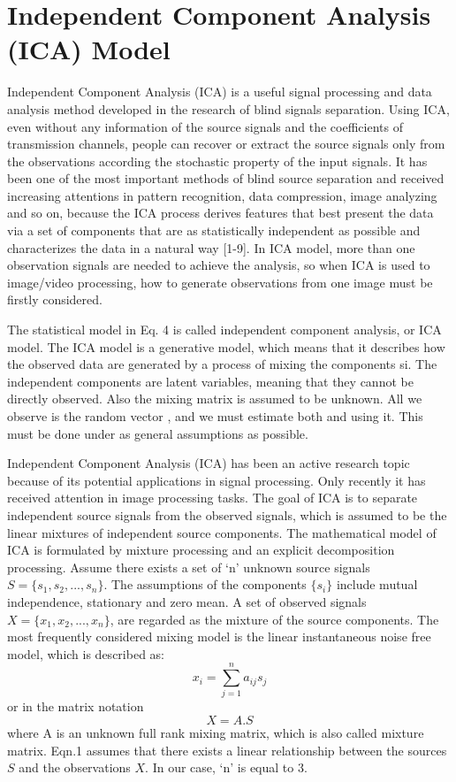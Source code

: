 \section{Independent Component Analysis (ICA) Model}
\label{sec:format}
Independent Component Analysis (ICA) is a useful signal processing and data 
analysis method developed in the research of blind signals separation. Using ICA, 
even without any information of the source signals and the coefficients of 
transmission channels, people can recover or extract the source signals only from the 
observations according the stochastic property of the input signals. It has been one of 
the most important methods of blind source separation and received increasing 
attentions in pattern recognition, data compression, image analyzing and so on, 
because the ICA process derives features that best present the data via a set of 
components that are as statistically independent as possible and characterizes the data 
in a natural way [1-9]. 
In ICA model, more than one observation signals are needed to achieve the 
analysis, so when ICA is used to image/video processing, how to generate 
observations from one image must be firstly considered.

The statistical model in Eq. 4 is called independent component analysis, or ICA model. 
The ICA model is a generative model, which means that it describes how the observed data are 
generated by a process of mixing the components si. The independent components are latent variables, 
meaning that they cannot be directly observed. Also the mixing matrix is assumed to be unknown. 
All we observe is the random vector , and we must estimate both  and  using it. This must be done 
under as general assumptions as possible.

Independent Component Analysis (ICA) has been an active research topic 
because of its potential applications in signal processing. Only recently 
it has received attention in image processing tasks.
The goal of ICA is to separate independent 
source signals from the observed signals, which is assumed 
to be the linear mixtures of independent source components. 
The mathematical model of ICA is formulated by 
mixture processing and an explicit decomposition processing.  
Assume there exists a set of `n' unknown source signals 
$S=\{s_1, s_2,..., s_n \}$. The assumptions of the components 
$\{s_i\}$  include mutual independence, stationary and zero mean. 
A set of observed signals $X=\{x_1,x_2,...,x_n\}$, are regarded as the mixture of the source 
components. The most frequently considered 
mixing model is the linear instantaneous noise free model,
which is described as: 
\begin{equation}
x_i=\sum_{j=1}^{n}a_{ij}s_j 
\end{equation}or in the matrix notation
\begin{equation}
X=A.S  
\end{equation}where A is an unknown full rank mixing matrix, which is 
also called mixture matrix. Eqn.1 assumes that there exists a 
linear relationship between the sources $S$ and the observations 
$X$. In our case, `n' is equal to 3. 


